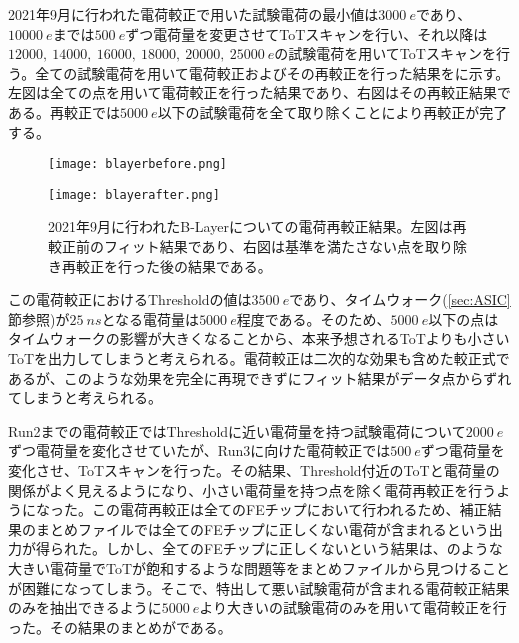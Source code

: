 2021年9月に行われた電荷較正で用いた試験電荷の最小値は$3000\ \si{e}$であり、$10000\ \si{e}$までは$500\ \si{e}$ずつ電荷量を変更させてToTスキャンを行い、それ以降は$12000,\ 14000,\ 16000,\ 18000,\ 20000,\ 25000\ \si{e}$の試験電荷を用いてToTスキャンを行う。全ての試験電荷を用いて電荷較正およびその再較正を行った結果をに示す。左図は全ての点を用いて電荷較正を行った結果であり、右図はその再較正結果である。再較正では$5000\ \si{e}$以下の試験電荷を全て取り除くことにより再較正が完了する。

\begin{figure}[tbp]
  \begin{minipage}[b]{0.5\linewidth}
    \centering
    \texttt{[image: blayerbefore.png]}
  \end{minipage}
  \begin{minipage}[b]{0.5\linewidth}
    \centering
    \texttt{[image: blayerafter.png]}
  \end{minipage}
  \caption[2021年9月に行われたB-Layerについての電荷較正結果]{2021年9月に行われたB-Layerについての電荷再較正結果。左図は再較正前のフィット結果であり、右図は基準を満たさない点を取り除き再較正を行った後の結果である。}
  \label{fig:blayerba}
\end{figure}

この電荷較正におけるThresholdの値は$3500\ \si{e}$であり、タイムウォーク(\ref{sec:ASIC}節参照)が$25\ \si{ns}$となる電荷量は$5000\ \si{e}$程度である。そのため、$5000\ \si{e}$以下の点はタイムウォークの影響が大きくなることから、本来予想されるToTよりも小さいToTを出力してしまうと考えられる。電荷較正は二次的な効果も含めた較正式であるが、このような効果を完全に再現できずにフィット結果がデータ点からずれてしまうと考えられる。

Run2までの電荷較正ではThresholdに近い電荷量を持つ試験電荷について$2000\ \si{e}$ずつ電荷量を変化させていたが、Run3に向けた電荷較正では$500\ \si{e}$ずつ電荷量を変化させ、ToTスキャンを行った。その結果、Threshold付近のToTと電荷量の関係がよく見えるようになり、小さい電荷量を持つ点を除く電荷再較正を行うようになった。この電荷再較正は全てのFEチップにおいて行われるため、補正結果のまとめファイルでは全てのFEチップに正しくない電荷が含まれるという出力が得られた。しかし、全てのFEチップに正しくないという結果は、のような大きい電荷量でToTが飽和するような問題等をまとめファイルから見つけることが困難になってしまう。そこで、特出して悪い試験電荷が含まれる電荷較正結果のみを抽出できるように$5000\ \si{e}$より大きいの試験電荷のみを用いて電荷較正を行った。その結果のまとめがである。

